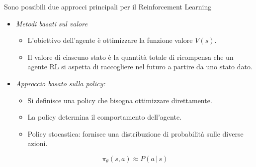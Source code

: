 Sono possibili due approcci principali per il Reinforcement Learning

\begin{itemize}
	\item \textit{Metodi basati sul valore}
	      \begin{itemize}
		      \item L’obiettivo dell’agente è ottimizzare la funzione valore $V(s)$.
		      \item Il valore di ciascuno stato è la quantità totale di ricompensa che un agente RL si aspetta di raccogliere nel futuro a partire da uno stato dato.
	      \end{itemize}
	\item \textit{Approccio basato sulla policy:}
	      \begin{itemize}
		      \item Si definisce una policy che bisogna ottimizzare direttamente.
		      \item La policy determina il comportamento dell’agente.
		      \item Policy stocastica: fornisce una distribuzione di probabilità sulle diverse azioni.
	      \end{itemize}
	      \[
		      \pi_\theta(s, a) \approx P(a\,|\,s)
	      \]
\end{itemize}

